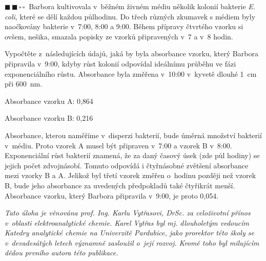 \documentclass{book}
\newcommand{\dva}{$\blacksquare \, \blacksquare \, \square \, \square \; \; $}
\renewenvironment{quotation}{\par}{\par} %
\begin{document}
\newpage %
\begin{quotation}
\dva Barbora kultivovala v~běžném živném médiu několik kolonií bakterie \textit{E. coli}, které se dělí každou půlhodinu. Do třech různých zkumavek
s médiem byly naočkovány bakterie v~7:00, 8:00 a 9:00. Během přípravy
čtvrtého vzorku si ovšem, nešika, smazala popisky ze vzorků připravených
v~7 a v~8 hodin. 

Vypočtěte z~následujících údajů, jaká by byla absorbance vzorku, který
Barbora připravila v~9:00, kdyby růst kolonií odpovídal ideálnímu průběhu
ve fázi exponenciálního růstu. Absorbance byla změřena v~10:00 v~kyvetě dlouhé 1~cm při 600~nm.

Absorbance vzorku A: 0,864

Absorbance vzorku B: 0,216 
\end{quotation} \dotfill \par 
Absorbance, kterou naměříme v~disperzi bakterií, bude úměrná množství
bakterií v~médiu. Proto vzorek A musel být připraven v~7:00 a vzorek
B v~8:00. Exponenciální růst bakterií znamená, že za daný časový úsek
(zde půl hodiny) se jejich počet zdvojnásobí. Tomuto odpovídá i
čtyřnásobné zvětšení absorbance mezi vzorky B a A. Jelikož byl třetí vzorek změřen o~hodinu později než vzorek B, bude jeho absorbance za uvedených předpokladů také čtyřikrát menší. Absorbance vzorku, který
Barbora připravila v~9:00, je proto 0,054. 

\hrulefill %

\textit{Tato úloha je věnována prof. Ing. Karlu Vytřasovi, DrSc. za
celoživotní přínos v~oblasti elektroanalytické chemie. Karel Vytřas
byl mj. dlouholetým vedoucím Katedry analytické chemie na Univerzitě
Pardubice, jako prorektor této školy se v~devadesátých letech významně
zasloužil o~její rozvoj. Kromě toho byl milujícím dědou prvního autora 
této publikace.}
\end{document}
